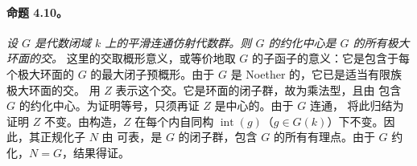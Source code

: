 \paragraph{\textbf{命题 4.10。}}
\emph{设 \(G\) 是代数闭域 \(k\) 上的平滑连通仿射代数群。则 \(G\) 的约化中心是 \(G\) 的所有极大环面的交。}
这里的交取概形意义，或等价地取 \(G\) 的子函子的意义：它是包含于每个极大环面的 \(G\) 的最大闭子预概形。由于 \(G\) 是 Noether 的，它已是适当有限族极大环面的交。
用 \(Z\) 表示这个交。它是环面的闭子群，故为乘法型，且由  包含 \(G\) 的约化中心。为证明等号，只须再证 \(Z\) 是中心的。由于 \(G\) 连通， 将此归结为证明 \(Z\) 不变。由构造，\(Z\) 在每个内自同构 \(\operatorname{int}(g)\)（\(g\in G(k)\)）下不变。因此，其正规化子 \(N\) 由  可表，是 \(G\) 的闭子群，包含 \(G\) 的所有有理点。由于 \(G\) 约化，\(N=G\)，结果得证。
